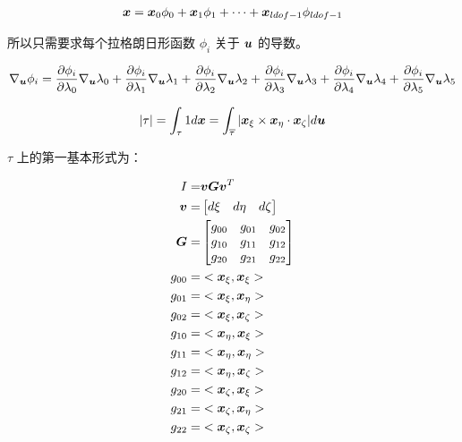 \documentclass{article}
\begin{document}
\begin{align*}
    {\boldsymbol x} = {\boldsymbol x}_0 \phi_0 + {\boldsymbol x}_1\phi_1 + \cdots + {\boldsymbol x}_{ldof-1}\phi_{ldof-1}
\end{align*}



所以只需要求每个拉格朗日形函数 $\phi_i$ 关于 ${\boldsymbol u}$ 的导数。

\begin{align*}
    \nabla_{\boldsymbol u} \phi_i = 
    \frac{\partial \phi_i}{\partial \lambda_0}\nabla_{\boldsymbol u} \lambda_0 + 
    \frac{\partial \phi_i}{\partial \lambda_1}\nabla_{\boldsymbol u} \lambda_1 + 
    \frac{\partial \phi_i}{\partial \lambda_2}\nabla_{\boldsymbol u} \lambda_2 +
    \frac{\partial \phi_i}{\partial \lambda_3}\nabla_{\boldsymbol u} \lambda_3 +
    \frac{\partial \phi_i}{\partial \lambda_4}\nabla_{\boldsymbol u} \lambda_4 +
    \frac{\partial \phi_i}{\partial \lambda_5}\nabla_{\boldsymbol u} \lambda_5 
\end{align*}


\begin{align*}
    |\tau| = \int_{\tau}1d{\boldsymbol x} =
    \int_{\overline{\tau}}|{\boldsymbol x}_{\xi}\times{\boldsymbol x}_{\eta}\cdot{\boldsymbol x}_{\zeta}|d{\boldsymbol u}
\end{align*}


$\tau$ 上的第一基本形式为：

\begin{align*}
	I = & {\boldsymbol v}{\boldsymbol G}{\boldsymbol v}^T \\
	{\boldsymbol v} = & 
	\begin{bmatrix}
	d\xi & d\eta & d\zeta
	\end{bmatrix}	\\
    {\boldsymbol G} = & 
    \begin{bmatrix}
        g_{00} & g_{01} & g_{02} \\
        g_{10} & g_{11} & g_{12} \\
        g_{20} & g_{21} & g_{22}
    \end{bmatrix}\\
    g_{00} = & <{\boldsymbol x}_\xi, {\boldsymbol x}_\xi> \\
    g_{01} = & <{\boldsymbol x}_\xi, {\boldsymbol x}_\eta> \\
    g_{02} = & <{\boldsymbol x}_\xi, {\boldsymbol x}_\zeta> \\
    g_{10} = & <{\boldsymbol x}_\eta,{\boldsymbol x}_\xi> \\
    g_{11} = & <{\boldsymbol x}_\eta,{\boldsymbol x}_\eta> \\
    g_{12} = & <{\boldsymbol x}_\eta,{\boldsymbol x}_\zeta> \\
    g_{20} = & <{\boldsymbol x}_\zeta,{\boldsymbol x}_\xi> \\
    g_{21} = & <{\boldsymbol x}_\zeta,{\boldsymbol x}_\eta> \\
    g_{22} = & <{\boldsymbol x}_\zeta,{\boldsymbol x}_\zeta>
\end{align*}
\end{document}

